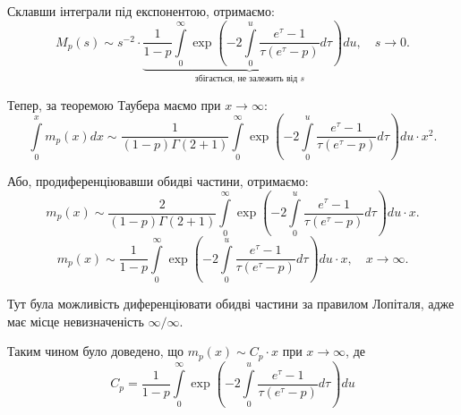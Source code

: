 Склавши інтеграли під експонентою, отримаємо:
\begin{equation}
M_p(s) \sim s^{-2} \cdot \underbrace{\frac{1}{1-p} \int\limits_0^\infty \exp\left( -2\int\limits_0^u \frac{e^{\tau} - 1}{\tau(e^\tau - p)} d\tau  \right) du}_{\text{збігається, не залежить від } s}, \quad s \rightarrow 0.
\end{equation}

Тепер, за теоремою Таубера маємо при $x \rightarrow \infty$:
\begin{equation}
\int\limits_0^x m_p(x) dx \sim \frac{1}{(1-p)\Gamma(2 + 1)} \int\limits_0^\infty \exp\left( -2\int\limits_0^u \frac{e^{\tau} - 1}{\tau(e^\tau - p)} d\tau  \right) du \cdot x^2.
\end{equation}

Або, продиференціювавши обидві частини,  отримаємо:
\begin{equation*}
m_p(x) \sim \frac{2}{(1- p) \Gamma(2 + 1)} \int\limits_0^\infty \exp\left( -2\int\limits_0^u \frac{e^{\tau} - 1}{\tau(e^\tau - p)} d\tau  \right) du \cdot x.
\end{equation*}
\begin{equation}
\label{eq:model_final}
m_p(x) \sim \frac{1}{1-p} \int\limits_0^\infty \exp\left( -2\int\limits_0^u \frac{e^{\tau} - 1}{\tau(e^\tau - p)} d\tau  \right) du \cdot x, \quad x \rightarrow \infty.
\end{equation}

Тут була можливість диференціювати обидві частини за правилом Лопіталя, адже має місце невизначеність $\infty / \infty$.

Таким чином було доведено, що $m_{p}(x) \sim C_{p} \cdot x$ при $x \rightarrow \infty$, де
\begin{equation}
C_{p} = \frac{1}{1-p} \int\limits_0^\infty \exp\left( -2\int\limits_0^u \frac{e^{\tau} - 1}{\tau(e^\tau - p)} d\tau  \right) du
\end{equation}
